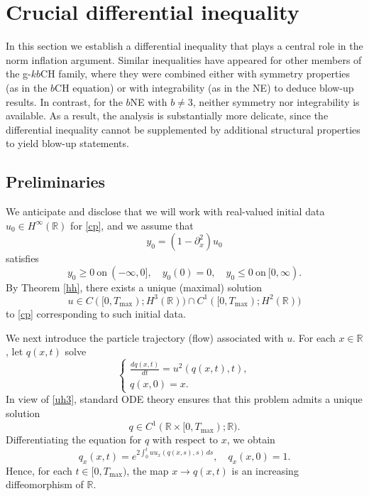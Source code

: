 \documentclass{amsart}
\newcommand{\R}{\mathbb R}
\begin{document}


\section{Crucial differential inequality}\label{3}
In this section we establish a differential inequality that plays a central role in the norm inflation argument. Similar inequalities have appeared for other members of the g-$kb$CH family, where they were combined either with symmetry properties (as in the $b$CH equation) or with integrability (as in the NE) to deduce blow-up results. In contrast, for the $b$NE with $b\neq 3$, neither symmetry nor integrability is available. As a result, the analysis is substantially more delicate, since the differential inequality cannot be supplemented by additional structural properties to yield blow-up statements.

 
 
 
\subsection*{Preliminaries}
We anticipate and disclose that we will work with real-valued initial data $u_0\in H^\infty(\R)$ for \eqref{cp}, and we assume that
\[
y_0=(1-\partial^2_x)u_0
\]
satisfies
\begin{equation}\label{y0}
y_0\geq 0\ \text{on}\ (-\infty, 0], \quad y_0(0)=0, \quad y_0\leq 0 \ \text{on}\ [0,\infty).
\end{equation}
By Theorem \ref{hh}, there exists a unique (maximal) solution
\begin{equation}
u\in C([0,T_{\text{max}}); H^3(\R))\cap C^1([0,T_{\text{max}}); H^{2}(\R))\label{uh3}
\end{equation}
to \eqref{cp} corresponding to such initial data.

We next introduce the particle trajectory (flow) associated with $u$. For each $x\in \R$, let $q(x,t)$ solve
\begin{equation*} 
\begin{cases}
\frac{dq(x,t)}{dt}=u^2(q(x,t), t),\\
q(x,0)=x.
\end{cases}
\end{equation*}
In view of \eqref{uh3}, standard ODE theory ensures that this problem admits a unique solution 
\[
q\in C^1(\R\times [0,T_{\text{max}}); \R).
\] 
Differentiating the equation for $q$ with respect to $x$, we obtain
\begin{equation*}
q_x(x,t)=e^{2\int_0^t uu_x(q(x,s),s)\,ds}, \quad q_x(x,0)=1.
\end{equation*}
Hence, for each $t\in [0,T_{\text{max}})$, the map $x\to q(x,t)$ is an increasing diffeomorphism of $\R$. 
\end{document}

